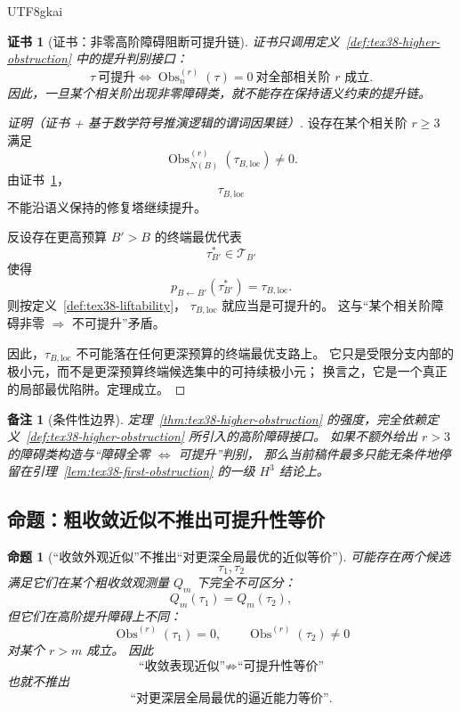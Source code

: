 \documentclass[12pt]{article}
\newtheorem{proposition}{命题}[section]
\newtheorem{remark}{备注}[section]
\newtheorem{Certificate}{证书}[section]
\newcommand{\Obs}{\operatorname{Obs}}
\begin{document}
\begin{CJK*}{UTF8}{gkai}
\begin{Certificate}[证书：非零高阶障碍阻断可提升链]
\label{cert:tex38-higher-obstruction}
证书只调用定义~\ref{def:tex38-higher-obstruction} 中的提升判别接口：
\[
  \tau\ \text{可提升}
  \iff
  \Obs^{(r)}_n(\tau)=0\ \text{对全部相关阶 }r\text{ 成立}.
\]
因此，一旦某个相关阶出现非零障碍类，就不能存在保持语义约束的提升链。
\end{Certificate}

\begin{proof}[证明（证书 + 基于数学符号推演逻辑的谓词因果链）]
设存在某个相关阶 $r\ge 3$ 满足
\[
  \Obs^{(r)}_{N(B)}(\tau_{B,\mathrm{loc}})\neq 0.
\]
由证书~\ref{cert:tex38-higher-obstruction}，
\[
  \tau_{B,\mathrm{loc}}
\]
不能沿语义保持的修复塔继续提升。

反设存在更高预算 $B'>B$ 的终端最优代表
\[
  \tau_{B'}^\ast\in\mathcal T_{B'}
\]
使得
\[
  p_{B\leftarrow B'}(\tau_{B'}^\ast)=\tau_{B,\mathrm{loc}}.
\]
则按定义~\ref{def:tex38-liftability}，
$\tau_{B,\mathrm{loc}}$ 就应当是可提升的。
这与“某个相关阶障碍非零 $\Rightarrow$ 不可提升”矛盾。

因此，$\tau_{B,\mathrm{loc}}$ 不可能落在任何更深预算的终端最优支路上。
它只是受限分支内部的极小元，而不是更深预算终端候选集中的可持续极小元；
换言之，它是一个真正的局部最优陷阱。定理成立。
\end{proof}

\begin{remark}[条件性边界]
定理~\ref{thm:tex38-higher-obstruction} 的强度，完全依赖定义~\ref{def:tex38-higher-obstruction} 所引入的高阶障碍接口。
如果不额外给出 $r>3$ 的障碍类构造与“障碍全零 $\Leftrightarrow$ 可提升”判别，
那么当前稿件最多只能无条件地停留在引理~\ref{lem:tex38-first-obstruction} 的一级 $H^3$ 结论上。
\end{remark}

\subsection{命题：粗收敛近似不推出可提升性等价}
\label{subsec:tex38-coarse-observable}

\begin{proposition}[“收敛外观近似”不推出“对更深全局最优的近似等价”]
\label{prop:tex38-coarse-observable}
可能存在两个候选
\[
  \tau_1,\tau_2
\]
满足它们在某个粗收敛观测量 $Q_m$ 下完全不可区分：
\[
  Q_m(\tau_1)=Q_m(\tau_2),
\]
但它们在高阶提升障碍上不同：
\[
  \Obs^{(r)}(\tau_1)=0,
  \qquad
  \Obs^{(r)}(\tau_2)\neq 0
\]
对某个 $r>m$ 成立。
因此
\[
  \text{“收敛表现近似”}
  \not\Longrightarrow
  \text{“可提升性等价”}
\]
也就不推出
\[
  \text{“对更深层全局最优的逼近能力等价”}.
\]
\end{proposition}


\end{CJK*}
\end{document}
